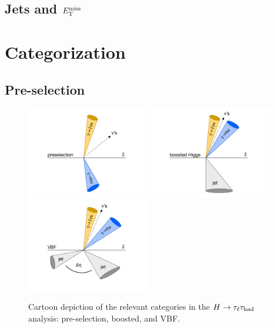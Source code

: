 \subsection{Jets and $E_{\mathrm{T}}^{\mathrm{miss}}$}
\label{sec:strategy-hadronic}

\section{Categorization}
\label{sec:strategy-categorization}

\subsection{Pre-selection}
\label{sec:strategy-preselection}

\begin{figure}[tp]
  \centering
  \includegraphics[width=0.48\textwidth]{figures/category-cartoons/presel}
  \includegraphics[width=0.48\textwidth]{figures/category-cartoons/boost}
  \includegraphics[width=0.48\textwidth]{figures/category-cartoons/vbf}
  \caption{Cartoon depiction of the relevant categories in the $H\rightarrow\tau_\ell\tau_\text{had}$ analysis: pre-selection, boosted, and VBF.}
  \label{fig:strategy-category-cartoons}
\end{figure}

